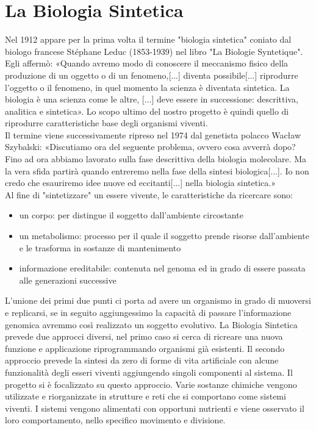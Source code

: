 \section{La Biologia Sintetica}
\label{sec:artificial}
Nel 1912 appare per la prima volta il termine "biologia sintetica" coniato dal biologo francese Stéphane Leduc (1853-1939) nel libro "La Biologie Syntetique". Egli affermò: «Quando avremo modo di conoscere il meccanismo fisico della produzione di un oggetto o di un fenomeno,[...] diventa possibile[...] riprodurre l'oggetto o il fenomeno, in quel momento la scienza è diventata sintetica. La biologia è una scienza come le altre, [...] deve essere in successione: descrittiva, analitica e sintetica». Lo scopo ultimo del nostro progetto è quindi quello di riprodurre caratteristiche base degli organismi viventi. 
\\Il termine viene successivamente ripreso nel 1974 dal genetista polacco Wacław Szybalski: «Discutiamo ora del seguente problema, ovvero cosa avverrà dopo? Fino ad ora abbiamo lavorato sulla fase descrittiva della biologia molecolare. Ma la vera sfida partirà quando entreremo nella fase della sintesi biologica[...]. Io non credo che esauriremo idee nuove ed eccitanti[...] nella biologia sintetica.» \cite{waclaw} 
\\Al fine di "sintetizzare" un essere vivente, le caratteristiche da ricercare sono:
\begin{itemize}
\item un corpo: per distingue il soggetto dall'ambiente circostante
\item un metabolismo: processo per il quale il soggetto prende risorse dall'ambiente e le trasforma in sostanze di mantenimento
\item informazione ereditabile: contenuta nel genoma ed in grado di essere passata alle generazioni successive
\end{itemize}
L'unione dei primi due punti ci porta ad avere un organismo in grado di muoversi e replicarsi, se in seguito aggiungessimo la capacità di passare l'informazione genomica avremmo così realizzato un soggetto evolutivo.
La Biologia Sintetica prevede due approcci diversi, nel primo caso si cerca di ricreare una nuova funzione e applicazione riprogrammando organismi già esistenti. Il secondo approccio prevede la sintesi da zero di forme di vita artificiale con alcune funzionalità degli esseri viventi aggiungendo singoli componenti al sistema. Il progetto si è focalizzato su questo approccio. Varie sostanze chimiche vengono utilizzate e riorganizzate in strutture e reti che si comportano come sistemi viventi. I sistemi vengono alimentati con opportuni nutrienti e viene osservato il loro comportamento, nello specifico movimento e divisione.   
\pagebreak
